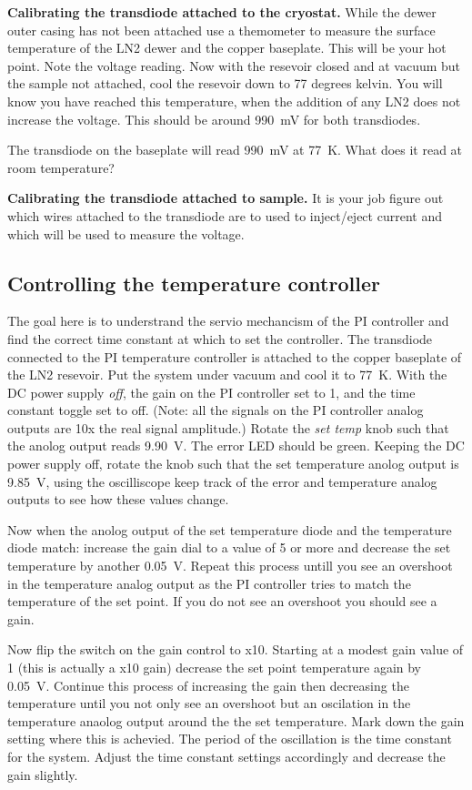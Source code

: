 \documentclass{apl-guide}
\newcommand{\K}{\SI{77}{\kelvin}}
\begin{document}
\textbf{Calibrating the transdiode attached to the cryostat.}
While the dewer outer casing has not been
attached use a themometer to measure the surface temperature of the LN2 dewer
and the copper baseplate. This will be your hot point. Note the voltage reading. 
Now with the resevoir closed and at vacuum but the sample not attached, cool the
resevoir down to 77 degrees kelvin. You will know you have reached this
temperature, when the addition of any LN2 does not increase the voltage. This
should be around \SI{990}{\mV} for both transdiodes.

The transdiode on the baseplate will read \SI{990}{\mV} at \K. What does it read
at room temperature?

\textbf{Calibrating the transdiode attached to sample.}
It is your job figure out which wires attached to the transdiode are to
used to inject/eject current and which will be used to measure the voltage. 

\subsection{Controlling the temperature controller}
The goal here is to understrand the servio mechancism of the PI controller and
find the correct time constant at which to set the controller. The transdiode
connected to the PI temperature controller is attached to the copper baseplate
of the LN2 resevoir. Put the system under vacuum and cool it to \K. With the DC
power supply \emph{off}, the gain on the PI controller set to 1, and the time
constant toggle set to off. (Note: all the signals on the PI controller analog
outputs are 10x the real signal amplitude.) Rotate the \emph{set temp} knob such that the
anolog output reads \SI{9.90}{\V}. The error LED should be green. Keeping the DC
power supply off, rotate the knob such that the set temperature anolog output is
\SI{9.85}{\V}, using the oscilliscope keep track of the error and temperature
analog outputs to see how these values change. 

Now when the anolog output of the set temperature diode and the temperature
diode match: increase the gain dial to a value of 5 or more and decrease the set
temperature by another \SI{0.05}{\V}. Repeat this process untill you see an
overshoot in the temperature analog output as the PI controller tries to match
the temperature of the set point. If you do not see an overshoot you should see
a gain. 

Now flip the switch on the gain control to x10. Starting at a modest gain value
of 1 (this is actually a x10 gain) decrease the set point temperature again by
\SI{0.05}{\V}. Continue this process of increasing the gain then decreasing the
temperature until you not only see an overshoot but an oscilation in the
temperature anaolog output around the the set temperature. Mark down the gain
setting where this is achevied. The period of the oscillation is the time
constant for the system. Adjust the time constant settings accordingly and
decrease the gain slightly.
\end{document}
